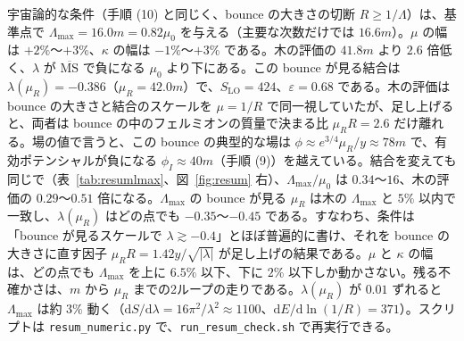 \documentclass[a4paper,10pt]{ltjsarticle}
\newcommand{\dd}{\mathrm{d}}
\newcommand{\MSbar}{\overline{\mathrm{MS}}}
\begin{document}
宇宙論的な条件（手順 (10) と同じく、bounce の大きさの切断 $R\ge1/\Lambda$）は、基準点で $\Lambda_{\max}=16.0m=0.82\mu_0$ を与える（主要な次数だけでは $16.6m$）。$\mu$ の幅は $+2\%$〜$+3\%$、$\kappa$ の幅は $-1\%$〜$+3\%$ である。木の評価の $41.8m$ より $2.6$ 倍低く、$\lambda$ が $\MSbar$ で負になる $\mu_0$ より下にある。この bounce が見る結合は $\lambda(\mu_R)=-0.386$（$\mu_R=42.0m$）で、$S_{\mathrm{LO}}=424$、$\varepsilon=0.68$ である。木の評価は bounce の大きさと結合のスケールを $\mu=1/R$ で同一視していたが、足し上げると、両者は bounce の中のフェルミオンの質量で決まる比 $\mu_RR=2.6$ だけ離れる。場の値で言うと、この bounce の典型的な場は $\phi\approx e^{3/4}\mu_R/y\approx78m$ で、有効ポテンシャルが負になる $\phi_I\approx40m$（手順 (9)）を越えている。結合を変えても同じで（表~\ref{tab:resumlmax}、図~\ref{fig:resum} 右）、$\Lambda_{\max}/\mu_0$ は $0.34$〜$16$、木の評価の $0.29$〜$0.51$ 倍になる。$\Lambda_{\max}$ の bounce が見る $\mu_R$ は木の $\Lambda_{\max}$ と $5\%$ 以内で一致し、$\lambda(\mu_R)$ はどの点でも $-0.35$〜$-0.45$ である。すなわち、条件は「bounce が見るスケールで $\lambda\gtrsim-0.4$」とほぼ普遍的に書け、それを bounce の大きさに直す因子 $\mu_RR=1.42y/\sqrt{|\lambda|}$ が足し上げの結果である。$\mu$ と $\kappa$ の幅は、どの点でも $\Lambda_{\max}$ を上に $6.5\%$ 以下、下に $2\%$ 以下しか動かさない。残る不確かさは、$m$ から $\mu_R$ までの2ループの走りである。$\lambda(\mu_R)$ が $0.01$ ずれると $\Lambda_{\max}$ は約 $3\%$ 動く（$\dd S/\dd\lambda=16\pi^2/\lambda^2\approx1100$、$\dd E/\dd\ln(1/R)=371$）。スクリプトは \texttt{resum\_numeric.py} で、\texttt{run\_resum\_check.sh} で再実行できる。
\end{document}
